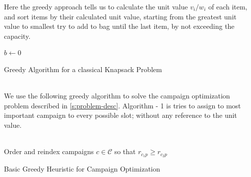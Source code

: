 \documentclass[11pt]{article}
\begin{document}
Here the greedy approach tells us to calculate the unit value $v_{i}/w_{i}$ of each item, and sort items by their calculated unit value, starting from the greatest unit value to smallest try to add to bag until the last item, by not exceeding the capacity.

\setcounter{algorithm}{-1}
\begin{algorithm}[H]
$b \gets 0$\;

\;
\caption{Greedy Algorithm for a classical Knapsack Problem}
\label{algo:generic_greedy}
\end{algorithm}\\

We use the following greedy algorithm to solve the campaign optimization problem described in \ref{s:problem-desc}. Algorithm - 1 is tries to assign to most important campaign to every possible slot; without any reference to the unit value.

\begin{algorithm}[H]
\\
Order and reindex campaigns $c\in\mathcal{C}$ so that $r_{c_{1}p} \geq r_{c_{2}p}$
\\
\;
\caption{Basic Greedy Heuristic for Campaign Optimization}
\label{algo:greedy_impl1}
\end{algorithm}\\
\end{document}
